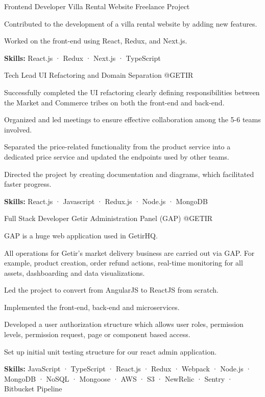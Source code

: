 \begin{cventries}
  \cventry
    {Frontend Developer} %
    {Villa Rental Website} %
    {Freelance Project} %
    {}
    {
      \begin{cvitems} %
        \item {Contributed to the development of a villa rental website by adding new features.}
        \item {Worked on the front-end using React, Redux, and Next.js.}
        \item {\textbf {Skills:} React.js · Redux · Next.js · TypeScript}
      \end{cvitems}
    }

  \cventry
    {Tech Lead} %
    {UI Refactoring and Domain Separation} %
    {@GETIR} %
    {}
    {
      \begin{cvitems} %
        \item {Successfully completed the UI refactoring clearly defining responsibilities between the Market and Commerce tribes on both the front-end and back-end.}
        \item {Organized and led meetings to ensure effective collaboration among the 5-6 teams involved.}
        \item {Separated the price-related functionality from the product service into a dedicated price service and updated the endpoints used by other teams.}
        \item {Directed the project by creating documentation and diagrams, which facilitated faster progress.}
        \item {\textbf {Skills:} React.js · Javascript · Redux.js · Node.js · MongoDB}
      \end{cvitems}
    }

  \cventry
  {Full Stack Developer} %
  {Getir Administration Panel (GAP)} %
  {@GETIR} %
  {}
  {
    \begin{cvitems} %
      \item {GAP is a huge web application used in GetirHQ.}
      \item {All operations for Getir's market delivery business are carried out via GAP. For example, product creation, order refund actions, real-time monitoring for all assets, dashboarding and data visualizations.}
      \item {Led the project to convert from AngularJS to ReactJS from scratch.}
      \item {Implemented the front-end, back-end and microservices.}
      \item {Developed a user authorization structure which allows user roles, permission levels, permission request, page or component based access.}
      \item {Set up initial unit testing structure for our react admin application.}
      \item {\textbf {Skills:} JavaScript · TypeScript · React.js · Redux · Webpack · Node.js · MongoDB · NoSQL · Mongoose · AWS · S3 · NewRelic · Sentry · Bitbucket Pipeline}
    \end{cvitems}
  }


\end{cventries}
